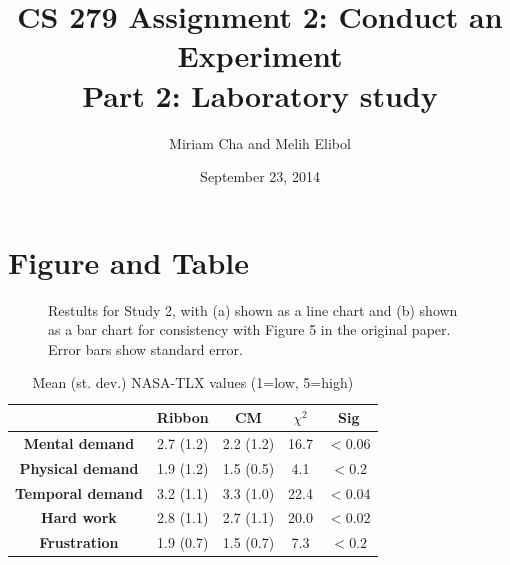 \documentclass{article}
\title{CS 279 Assignment 2: Conduct an Experiment\\Part 2: Laboratory study}
\author{Miriam Cha and Melih Elibol}
\date{September 23, 2014}
\begin{document}
\maketitle

\section*{Figure and Table} 

\begin{figure}[tbh]
    \centering
    \caption{Restults for Study 2, with (a) shown as a line chart and (b) shown as a bar chart for consistency with Figure 5 in the original paper. Error bars show standard error.}
    \label{fig:result1}
\end{figure}

 \begin{table}[tbh]
  \centering
\begin{tabular}{c|c|c|c|c}
  &  \textbf{Ribbon}  &  \textbf{CM} &  \textbf{$\chi^2$} & \textbf{Sig}          \\\hline
 \textbf{Mental demand}&   2.7 (1.2)  & 2.2 (1.2)  & 16.7  & $<0.06$   \\ \hline
 \rowcolor{lightgray}
\textbf{Physical demand}  &    1.9 (1.2) &   1.5 (0.5) & 4.1  & $<0.2$  \\\hline       
\textbf{Temporal demand}  &    3.2 (1.1) &   3.3 (1.0) & 22.4  & $<0.04$  \\\hline      
 \rowcolor{lightgray}
\textbf{Hard work}  &    2.8 (1.1) &   2.7 (1.1) & 20.0  & $<0.02$   \\\hline   
\textbf{Frustration}  &    1.9 (0.7) &   1.5 (0.7) & 7.3  & $<0.2$ \\ \hline \hline
\end{tabular}
\caption{Mean (st. dev.) NASA-TLX values (1=low, 5=high)}
\label{fig:trial_log}
\end{table}
\end{document}
